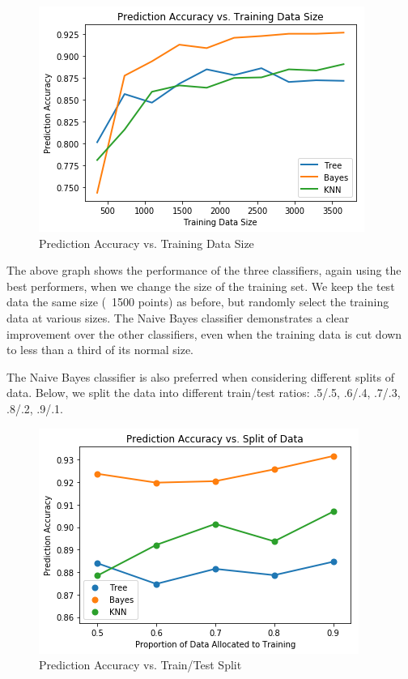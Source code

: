 \documentclass[twoside,11pt]{homework}
\begin{document}
	
	\begin{figure}[H]
		\centering
		\includegraphics[scale=.5]{q6_fig/learning_curve.png}	
		\caption{Prediction Accuracy vs. Training Data Size}
	\end{figure}
	
	The above graph shows the performance of the three classifiers, again using the best performers, when we change the size of the training set. We keep the test data the same size (~1500 points) as before, but randomly select the training data at various sizes. The Naive Bayes classifier demonstrates a clear improvement over the other classifiers, even when the training data is cut down to less than a third of its normal size. 
	
	The Naive Bayes classifier is also preferred when considering different splits of data. Below, we split the data into different train/test ratios: .5/.5, .6/.4, .7/.3, .8/.2, .9/.1.
	
		\begin{figure}[H]
		\centering
		\includegraphics[scale=.5]{q6_fig/split.png}	
		\caption{Prediction Accuracy vs. Train/Test Split}
	\end{figure}
\end{document}
